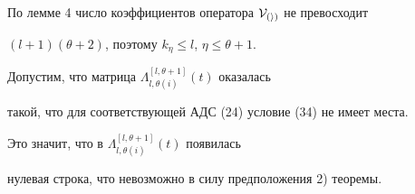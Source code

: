 \begin{pf}
По лемме 4 число коэффициентов оператора $\cal V_{(i)}$ не превосходит


$(l+1)(\theta +2)$, поэтому $k_\eta \le l$, $\eta \le \theta +1$.





Допустим, что матрица $\Lambda_{l,\theta(i)}^{[l,\theta+1]}(t)$ оказалась


такой, что для соответствующей АДС (24) условие (34) не имеет места.


Это значит, что в $\Lambda_{l,\theta(i)}^{[l,\theta+1]}(t)$ появилась


нулевая строка, что невозможно в силу предположения 2) теоремы.


\end{pf}





